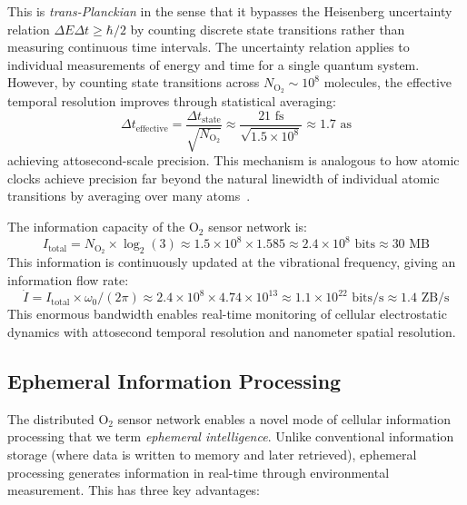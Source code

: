 \documentclass[twocolumn,10pt,aps,prd,superscriptaddress,floatfix,nofootinbib]{revtex4-2}
\theoremstyle{remark}
\begin{document}
This is \textit{trans-Planckian} in the sense that it bypasses the Heisenberg uncertainty relation $\Delta E \Delta t \geq \hbar/2$ by counting discrete state transitions rather than measuring continuous time intervals. The uncertainty relation applies to individual measurements of energy and time for a single quantum system. However, by counting state transitions across $N_{\mathrm{O_2}} \sim 10^{8}$ molecules, the effective temporal resolution improves through statistical averaging:
\begin{equation}
\Delta t_{\mathrm{effective}} = \frac{\Delta t_{\mathrm{state}}}{\sqrt{N_{\mathrm{O_2}}}} \approx \frac{21 \text{ fs}}{\sqrt{1.5 \times 10^{8}}} \approx 1.7 \text{ as}
\label{eq:transplanckian_resolution}
\end{equation}
achieving attosecond-scale precision. This mechanism is analogous to how atomic clocks achieve precision far beyond the natural linewidth of individual atomic transitions by averaging over many atoms~\cite{Ludlow2015}.

The information capacity of the O$_2$ sensor network is:
\begin{equation}
I_{\mathrm{total}} = N_{\mathrm{O_2}} \times \log_2(3) \approx 1.5 \times 10^{8} \times 1.585 \approx 2.4 \times 10^{8} \text{ bits} \approx 30 \text{ MB}
\end{equation}
This information is continuously updated at the vibrational frequency, giving an information flow rate:
\begin{equation}
\dot{I} = I_{\mathrm{total}} \times \omega_0/(2\pi) \approx 2.4 \times 10^{8} \times 4.74 \times 10^{13} \approx 1.1 \times 10^{22} \text{ bits/s} \approx 1.4 \text{ ZB/s}
\end{equation}
This enormous bandwidth enables real-time monitoring of cellular electrostatic dynamics with attosecond temporal resolution and nanometer spatial resolution.

\subsection{Ephemeral Information Processing}

The distributed O$_2$ sensor network enables a novel mode of cellular information processing that we term \textit{ephemeral intelligence}. Unlike conventional information storage (where data is written to memory and later retrieved), ephemeral processing generates information in real-time through environmental measurement. This has three key advantages:
\end{document}
